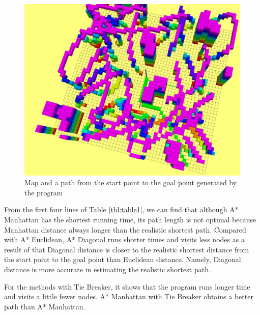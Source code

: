 \documentclass[conference]{IEEEtran}
\begin{document}
\begin{figure}[htbp]
	\centering
	\includegraphics[scale=0.2]{figs/fig4_1.png}
	\caption{Map and a path from the start point to the goal point generated by the program}
	\label{fig:label4_1}
\end{figure}

From the first four lines of Table \ref {tbl:table1}, we can find that although A* Manhattan has the shortest running time, its path length is not optimal because Manhattan distance always longer than the realistic shortest path. Compared with A* Euclidean, A* Diagonal runs shorter times and visits less nodes as a result of that Diagonal distance is closer to the realistic shortest distance from the start point to the goal point than Euclidean distance. Namely, Diagonal distance is more accurate in estimating the realistic shortest path.

For the methods with Tie Breaker, it shows that the program runs longer time and visits a little fewer nodes. A* Manhattan with Tie Breaker obtains a better path than A* Manhattan.
\end{document}
